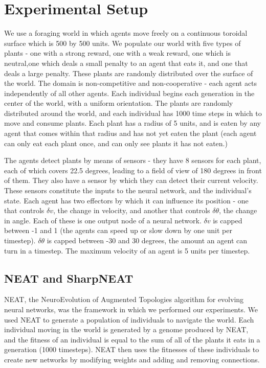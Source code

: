 \documentclass{acm_proc_article-sp}
\begin{document}
\section{Experimental Setup}
\label{sec:setup}

    We use a foraging world in which agents move freely on a continuous toroidal surface which is 500 by 500 units.  
We populate our world with five types of plants - one with a strong reward, one with a weak reward, one which is neutral,one which deals a small penalty to an agent that eats it, and one that deals a large penalty.  
These plants are randomly distributed over the surface of the world.
  The domain is non-competitive and non-cooperative - each agent acts independently of all other agents.
  Each individual begins each generation in the center of the world, with a uniform orientation.
  The plants are randomly distributed around the world, and each individual has 1000 time steps in which to move and consume plants.
  Each plant has a radius of 5 units, and is eaten by any agent that comes within that radius and has not yet eaten the plant (each agent can only eat each plant once, and can only see plants it has not eaten.)
  
 The agents detect plants by means of sensors - they have 8 sensors for each plant, each of which covers 22.5 degrees, leading to a field of view of 180 degrees in front of them.
   They also have a sensor by which they can detect their current velocity.
   These sensors constitute the inputs to the neural network, and the individual's state.
Each agent has two effectors by which it can influence its position - one that controls $\delta v$, the change in velocity, and another that controls $\delta \theta$, the change in angle.
Each of these is one output node of a neural network.
  $\delta v$ is capped between -1 and 1 (the agents can speed up or slow down by one unit per timestep).
  $\delta \theta$ is capped between -30 and 30 degrees, the amount an agent can turn in a timestep.
  The maximum velocity of an agent is 5 units per timestep.
\subsection*{NEAT and SharpNEAT}
NEAT, the NeuroEvolution of Augmented Topologies algorithm for evolving neural networks, was the framework in which we performed our experiments.  
We used NEAT to generate a population of individuals to navigate the world.  
Each individual moving in the world is generated by a genome produced by NEAT, and the fitness of an individual is equal to the sum of all of the plants it eats in a generation (1000 timesteps).
NEAT then uses the fitnesses of these individuals to create new networks by modifying weights and adding and removing connections.
\end{document}
